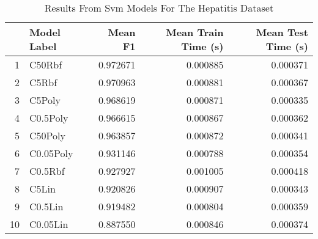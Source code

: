 \begin{table}[!htbp]
\centering
\caption{Results From Svm Models For The Hepatitis Dataset}
\label{tab:svm_results_hepatitis}
\begin{tabular}{rlrrr}
\toprule
 & Model Label & Mean F1 & Mean Train Time (s) & Mean Test Time (s) \\
\midrule
1 & C50Rbf & 0.972671 & 0.000885 & 0.000371 \\
2 & C5Rbf & 0.970963 & 0.000881 & 0.000367 \\
3 & C5Poly & 0.968619 & 0.000871 & 0.000335 \\
4 & C0.5Poly & 0.966615 & 0.000867 & 0.000362 \\
5 & C50Poly & 0.963857 & 0.000872 & 0.000341 \\
6 & C0.05Poly & 0.931146 & 0.000788 & 0.000354 \\
7 & C0.5Rbf & 0.927927 & 0.001005 & 0.000418 \\
8 & C5Lin & 0.920826 & 0.000907 & 0.000343 \\
9 & C0.5Lin & 0.919482 & 0.000804 & 0.000359 \\
10 & C0.05Lin & 0.887550 & 0.000846 & 0.000374 \\
\bottomrule
\end{tabular}
\end{table}
